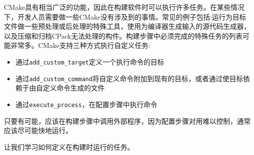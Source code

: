 CMake具有相当广泛的功能，因此在构建软件时可以执行许多任务。在某些情况下，开发人员需要做一些CMake没有涉及到的事情。常见的例子包括:运行为目标文件做一些预处理或后处理的特殊工具，使用为编译器生成输入的源代码生成器，以及压缩和归档CPack无法处理的构件。构建步骤中必须完成的特殊任务的列表可能非常多。CMake支持三种方式执行自定义任务:

\begin{itemize}
\item 
通过\texttt{add\_custom\_target}定义一个执行命令的目标

\item 
通过\texttt{add\_custom\_command}将自定义命令附加到现有的目标，或者通过使目标依赖于由自定义命令生成的文件

\item 
通过\texttt{execute\_process}，在配置步骤中执行命令
\end{itemize}

只要有可能，应该在构建步骤中调用外部程序，因为配置步骤对用难以控制，通常应该尽可能快地运行。

让我们学习如何定义在构建时运行的任务。